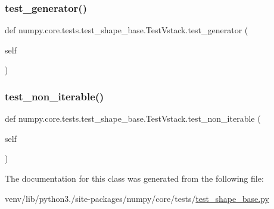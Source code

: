 \subsubsection{\texorpdfstring{test\+\_\+generator()}{test\_generator()}}
{\footnotesize\ttfamily def numpy.\+core.\+tests.\+test\+\_\+shape\+\_\+base.\+Test\+Vstack.\+test\+\_\+generator (\begin{DoxyParamCaption}\item[{}]{self }\end{DoxyParamCaption})}

\mbox{\label{classnumpy_1_1core_1_1tests_1_1test__shape__base_1_1TestVstack_a5e4099aa235d6b5fb95193a7cf2644e0}} 
\subsubsection{\texorpdfstring{test\+\_\+non\+\_\+iterable()}{test\_non\_iterable()}}
{\footnotesize\ttfamily def numpy.\+core.\+tests.\+test\+\_\+shape\+\_\+base.\+Test\+Vstack.\+test\+\_\+non\+\_\+iterable (\begin{DoxyParamCaption}\item[{}]{self }\end{DoxyParamCaption})}



The documentation for this class was generated from the following file\+:\begin{DoxyCompactItemize}
\item 
venv/lib/python3./site-\/packages/numpy/core/tests/\hyperlink{core_2tests_2test__shape__base_8py}{test\+\_\+shape\+\_\+base.\+py}\end{DoxyCompactItemize}

